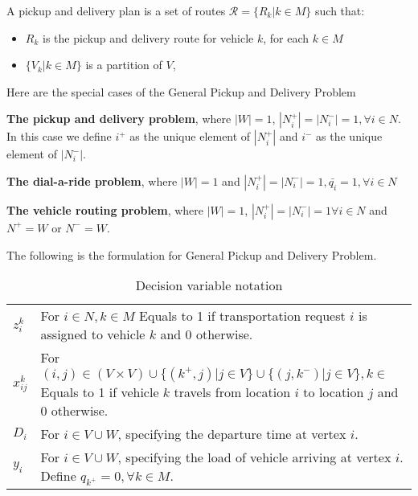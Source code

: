 				\begin{definition}
					A pickup and delivery plan is a set of routes $\mathcal{R} = \{R_k |k \in M\}$ such that:
					\begin{itemize}
						\item $R_k$ is the pickup and delivery route for vehicle $k$, for each $k \in M$
						\item $\{V_k |k \in M\}$ is a partition of $V$,
					\end{itemize}
				\end{definition}

				Here are the special cases of the General Pickup and Delivery Problem
				\begin{example}
					\textbf{The pickup and delivery problem}, where $|W| = 1$, $|N_i^+| = |N_i^-| = 1, \forall i \in N$. In this case we define $i^+$ as the unique element of $|N_i^+|$ and $i^-$ as the unique element of $|N_i^-|$.
				\end{example}

				\begin{example}
					\textbf{The dial-a-ride problem}, where $|W| = 1$ and $|N_i^+| = |N_i^-| = 1, \bar{q_i} = 1, \forall i \in N$
				\end{example}

				\begin{example}
					\textbf{The vehicle routing problem}, where $|W| = 1$, $|N_i^+| = |N_i^-| = 1 \forall i \in N$ and $N^+ = W$ or $N^- = W$.
				\end{example}



				The following is the formulation for General Pickup and Delivery Problem.

				\begin{table}[!htp]
					\centering
					\caption{Decision variable notation}
					\begin{tabular}{l p{5in}}
						\hline
						$z_i^k$ & For $i \in N, k \in M$ Equals to 1 if transportation request $i$ is assigned to vehicle $k$ and 0 otherwise. \\
						$x_{ij}^k$ & For $(i, j) \in (V \times V) \cup \{(k^+, j)| j \in V\} \cup \{(j, k^-)|j \in V\}, k \in $ Equals to 1 if vehicle $k$ travels from location $i$ to location $j$ and 0 otherwise.\\
						$D_i$ & For $i \in V\cup W$, specifying the departure time at vertex $i$.\\
						$y_i$ & For $i \in V\cup W$, specifying the load of vehicle arriving at vertex $i$. Define $q_{k^+} = 0, \forall k \in M$.\\
						\hline	
					\end{tabular}
				\end{table}

